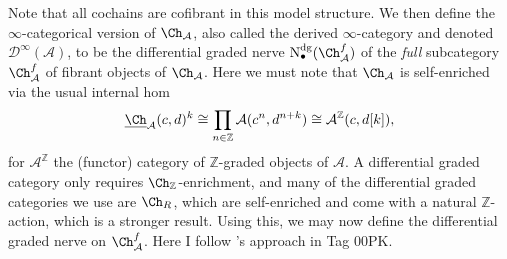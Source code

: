 Note that all cochains are cofibrant in this model structure. We then define the $\infty $-categorical version of $\Ch_{\mathcal{A} }$, also called the derived $\infty $-category and denoted $\mathcal{D}^{\infty }(\mathcal{A} )$, to be the differential graded nerve $\mathrm{N}^{\mathrm{dg}}_{\bullet}(\Ch_{\mathcal{A} }^{f} )$ of the \emph{full} subcategory $\Ch_{\mathcal{A} }^f$ of fibrant objects of $\Ch_{\mathcal{A} }$. Here we must note that $\Ch_{\mathcal{A} } $ is self-enriched via the usual internal hom
\[
	\underline{\Ch} _{\mathcal{A} }(c,d)^k \cong \prod_{n\in\mathbb{Z} } \mathcal{A} (c^n,d^{n+k} )\cong  \mathcal{A}^{\mathbb{Z} }(c,d[k]),
\]
for $\mathcal{A}^{\mathbb{Z} }$ the (functor) category of $\mathbb{Z} $-graded objects of $\mathcal{A} $. A differential graded category only requires $\Ch_{\mathbb{Z} } $-enrichment, and many of the differential graded categories we use are $\Ch_{R} $, which are self-enriched and come with a natural $\mathbb{Z} $-action, which is a stronger result. Using this, we may now define the differential graded nerve on $\Ch_{\mathcal{A} } ^{f} $. Here I follow \cite{kerodon}'s approach in Tag 00PK.

